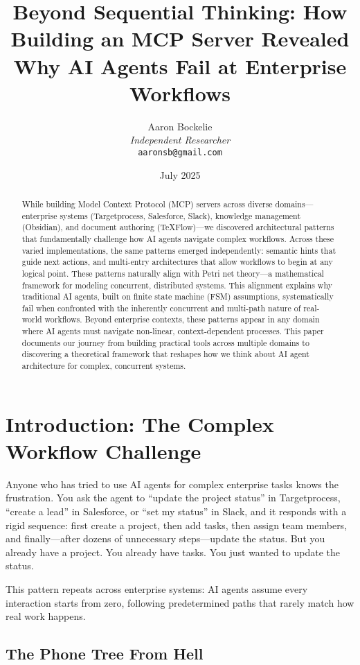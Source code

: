 \documentclass[11pt,a4paper]{article}
\title{Beyond Sequential Thinking: How Building an MCP Server Revealed Why AI Agents Fail at Enterprise Workflows}
\author{Aaron Bockelie\\
\textit{Independent Researcher}\\
\texttt{aaronsb@gmail.com}}
\date{July 2025}
\begin{document}
\maketitle

\begin{abstract}
While building Model Context Protocol (MCP) servers across diverse domains—enterprise systems (Targetprocess, Salesforce, Slack), knowledge management (Obsidian), and document authoring (TeXFlow)—we discovered architectural patterns that fundamentally challenge how AI agents navigate complex workflows. Across these varied implementations, the same patterns emerged independently: semantic hints that guide next actions, and multi-entry architectures that allow workflows to begin at any logical point. These patterns naturally align with Petri net theory—a mathematical framework for modeling concurrent, distributed systems. This alignment explains why traditional AI agents, built on finite state machine (FSM) assumptions, systematically fail when confronted with the inherently concurrent and multi-path nature of real-world workflows. Beyond enterprise contexts, these patterns appear in any domain where AI agents must navigate non-linear, context-dependent processes. This paper documents our journey from building practical tools across multiple domains to discovering a theoretical framework that reshapes how we think about AI agent architecture for complex, concurrent systems.
\end{abstract}

\section{Introduction: The Complex Workflow Challenge}

Anyone who has tried to use AI agents for complex enterprise tasks knows the frustration. You ask the agent to ``update the project status'' in Targetprocess, ``create a lead'' in Salesforce, or ``set my status'' in Slack, and it responds with a rigid sequence: first create a project, then add tasks, then assign team members, and finally—after dozens of unnecessary steps—update the status. But you already have a project. You already have tasks. You just wanted to update the status.

This pattern repeats across enterprise systems: AI agents assume every interaction starts from zero, following predetermined paths that rarely match how real work happens.

\subsection{The Phone Tree From Hell}
\end{document}
